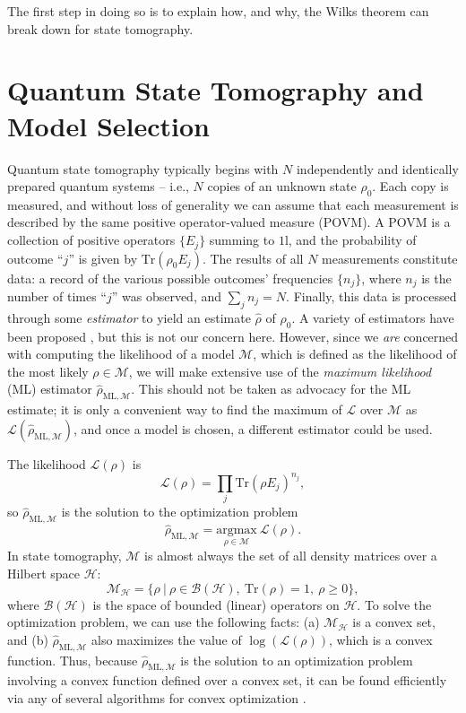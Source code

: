 \documentclass[aps,pra, twocolumn]{revtex4-1}
\newcommand{\M}{\mathcal{M}}
\newcommand{\Tr}{\mathrm{Tr}}
\newcommand{\cH}{\mathcal{H}}
\newcommand{\cL}{\mathcal{L}}
\newcommand{\Id}{\mathbb{I}}
\def\Id{1\!\mathrm{l}}
\newcommand{\rhohat}{\hat{\rho}}
\newcommand{\rhoML}[1]{\rhohat_{\scriptscriptstyle{\mathrm{ML},#1}}}
\begin{document}
The first step in doing so is to explain how, and why, the Wilks theorem can break down for state tomography.

\section{Quantum State Tomography and Model Selection}
\label{sec:qstmodelselection}
Quantum state tomography typically begins with $N$ independently and identically prepared quantum systems -- i.e., $N$ copies of an unknown state $\rho_{0}$.  Each copy is measured, and without loss of generality we can assume that each measurement is described by the same positive operator-valued measure (POVM).  A POVM is a collection of positive operators $\{E_j\}$ summing to $\Id$, and the probability of outcome ``$j$'' is given by $\Tr(\rho_0 E_j)$.  The results of all $N$ measurements constitute data:  a record of the various possible outcomes' frequencies $\{n_{j}\}$, where $n_{j}$ is the number of times ``$j$'' was observed, and $\sum_{j}n_{j} = N$.  Finally, this data is processed through some \emph{estimator} to yield an estimate $\hat{\rho}$ of $\rho_0$.  A variety of estimators have been proposed \cite{Vogel1989,Hradil1997,JamesPRA2001,Blume-Kohout2010b,Blume-Kohout2010,Zhu2014a,Ferrie2016}, but this is not our concern here.  However, since we \emph{are} concerned with computing the likelihood of a model $\M$, which is defined as the likelihood of the most likely $\rho\in\M$, we will make extensive use of the \emph{maximum likelihood} (ML) estimator $\rhoML{\M}$.  This should not be taken as advocacy for the ML estimate; it is only a convenient way to find the maximum of $\cL$ over $\M$ as $\mathcal{L}(\rhoML{\M})$, and once a model is chosen, a different estimator could be used.

The likelihood $\mathcal{L}(\rho)$ is
\begin{equation}
\mathcal{L}(\rho) = \prod_{j}\mathrm{Tr}(\rho E_{j})^{n_{j}},
\end{equation}
so $\rhoML{\M}$ is the solution to the optimization problem
\begin{equation}
\label{eq:mle}
\rhoML{\M} = \underset{\rho \in \M}{\text{argmax}}~\mathcal{L}(\rho).
\end{equation}
In state tomography, $\M$ is almost always the set of all density matrices over a Hilbert space $\cH$:
\begin{equation}
\mathcal{M}_{\cH} = \{\rho~|~\rho \in \mathcal{B}(\mathcal{H}),~\mathrm{Tr}(\rho) =1,~\rho \geq 0\},
\end{equation}
where $\mathcal{B}(\cH)$ is the space of bounded (linear) operators on $\cH$.  To solve the optimization problem, we can use the following facts: (a) $\M_{\cH}$ is a convex set, and (b) $\rhoML{\M}$ also maximizes the value of $\log(\cL(\rho))$, which is a convex function. Thus, because $\rhoML{\M}$ is the solution to an optimization problem involving a convex function defined over a convex set, it can be found efficiently via any of several algorithms for convex optimization \cite{Boyd}.
\end{document}
